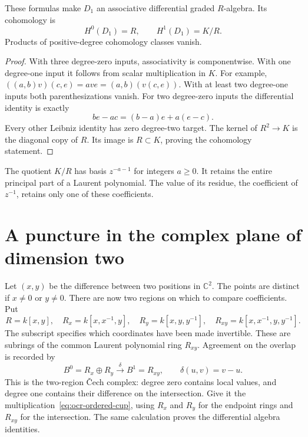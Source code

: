 \begin{proposition}\label{prop:ocr-line-algebra}
These formulas make $D_1$ an associative differential graded $R$-algebra.
Its cohomology is
\[
 H^0(D_1)=R,\qquad H^1(D_1)=K/R.
\]
Products of positive-degree cohomology classes vanish.
\end{proposition}

\begin{proof}
With three degree-zero inputs, associativity is componentwise.
With one degree-one input it follows from scalar multiplication in $K$.
For example,
$((a,b)v)(c,e)=ave=(a,b)(v(c,e))$.
With at least two degree-one inputs both parenthesizations vanish.
For two degree-zero inputs the differential identity is exactly
\[
 be-ac=(b-a)e+a(e-c).
\]
Every other Leibniz identity has zero degree-two target.
The kernel of $R^2\to K$ is the diagonal copy of $R$.
Its image is $R\subset K$, proving the cohomology statement.
\end{proof}

The quotient $K/R$ has basis $z^{-a-1}$ for integers $a\ge0$.
It retains the entire principal part of a Laurent polynomial.
The value of its residue, the coefficient of $z^{-1}$, retains only
one of these coefficients.

\section{A puncture in the complex plane of dimension two}

Let $(x,y)$ be the difference between two positions in $\mathbb C^2$.
The points are distinct if $x\ne0$ or $y\ne0$.
There are now two regions on which to compare coefficients.
Put
\[
 R=k[x,y],\quad R_x=k[x,x^{-1},y],\quad
 R_y=k[x,y,y^{-1}],\quad
 R_{xy}=k[x,x^{-1},y,y^{-1}].
\]
The subscript specifies which coordinates have been made invertible.
These are subrings of the common Laurent polynomial ring $R_{xy}$.
Agreement on the overlap is recorded by
\begin{equation}\label{eq:ocr-puncture-complex}
 B^0=R_x\oplus R_y
 \xrightarrow{\ \delta\ }B^1=R_{xy},
 \qquad \delta(u,v)=v-u.
\end{equation}
This is the two-region \v{C}ech complex: degree zero contains local
values, and degree one contains their difference on the intersection.
Give it the multiplication~\eqref{eq:ocr-ordered-cup}, using $R_x$
and $R_y$ for the endpoint rings and $R_{xy}$ for the intersection.
The same calculation proves the differential algebra identities.

